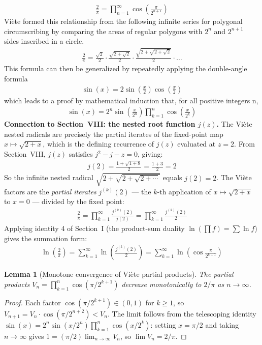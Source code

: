 \documentclass{article}
\newtheorem{lemma}{Lemma}
\begin{document}
\begin{align*}
\frac{2}{\pi} = \prod_{n=1}^{\infty} \cos\left(\frac{\pi}{2^{n+1}}\right)
\end{align*}
Vi\`ete formed this relationship from the following infinite series for polygonal circumscribing by comparing the areas of regular polygons with $2^{n}$ and $2^{n+1}$ sides inscribed in a circle.
\begin{align*}
\frac{2}{\pi} = \frac{\sqrt{2}}{2} \cdot \frac{\sqrt{2+\sqrt{2}}}{2} \cdot \frac{\sqrt{2+\sqrt{2+\sqrt{2}}}}{2} \cdot \ldots
\end{align*}
This formula can then be generalized by repeatedly applying the double-angle formula
\begin{align*}
\sin(x) = 2\sin(\frac{x}{2})\cos(\frac{x}{2})
\end{align*}
which leads to a proof by mathematical induction that, for all positive integers n,
\begin{align*}
\sin(x) = 2^{n}\sin\!\left(\frac{x}{2^{n}}\right)\prod_{k=1}^{n} \cos\!\left(\frac{x}{2^{k}}\right)
\end{align*}
\textbf{Connection to Section~VIII: the nested root function $j(z)$.} The Viète nested radicals are precisely the partial iterates of the fixed-point map $x \mapsto \sqrt{2+x}$, which is the defining recurrence of $j(z)$ evaluated at $z = 2$. From Section~VIII, $j(z)$ satisfies $j^2 - j - z = 0$, giving:
\begin{align*}
j(2) = \frac{1+\sqrt{1+8}}{2} = \frac{1+3}{2} = 2
\end{align*}
So the infinite nested radical $\sqrt{2+\sqrt{2+\sqrt{2+\cdots}}}$ equals $j(2) = 2$. The Viète factors are the \emph{partial iterates} $j^{(k)}(2)$ — the $k$-th application of $x\mapsto\sqrt{2+x}$ to $x=0$ — divided by the fixed point:
\begin{align*}
\frac{2}{\pi} = \prod_{k=1}^{\infty} \frac{j^{(k)}(2)}{j(2)} = \prod_{k=1}^{\infty} \frac{j^{(k)}(2)}{2}
\end{align*}
Applying identity 4 of Section~I (the product-sum duality $\ln(\prod f) = \sum \ln f$) gives the summation form:
\begin{align*}
\ln\!\left(\frac{2}{\pi}\right) = \sum_{k=1}^{\infty} \ln\!\left(\frac{j^{(k)}(2)}{2}\right) = \sum_{k=1}^{\infty} \ln\!\left(\cos\frac{\pi}{2^{k+1}}\right)
\end{align*}

\begin{lemma}[Monotone convergence of Viète partial products]
The partial products $V_n = \prod_{k=1}^{n} \cos\!\left(\pi/2^{k+1}\right)$ decrease monotonically to $2/\pi$ as $n \to \infty$.
\end{lemma}
\begin{proof}
Each factor $\cos(\pi/2^{k+1}) \in (0,1)$ for $k \geq 1$, so $V_{n+1} = V_n \cdot \cos(\pi/2^{n+2}) < V_n$. The limit follows from the telescoping identity $\sin(x) = 2^n \sin(x/2^n) \prod_{k=1}^n \cos(x/2^k)$: setting $x = \pi/2$ and taking $n \to \infty$ gives $1 = (\pi/2)\lim_{n\to\infty} V_n$, so $\lim V_n = 2/\pi$.
\end{proof}
\end{document}
